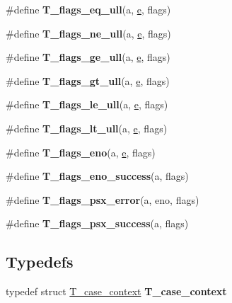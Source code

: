 \begin{DoxyCompactItemize}
\item 
\#define {\bfseries T\+\_\+flags\+\_\+eq\+\_\+ull}(a,  \mbox{\hyperlink{sun4u_2tte_8h_a8b0b9ed08e0e18920ec2682f48228c27}{e}},  flags)
\item 
\#define {\bfseries T\+\_\+flags\+\_\+ne\+\_\+ull}(a,  \mbox{\hyperlink{sun4u_2tte_8h_a8b0b9ed08e0e18920ec2682f48228c27}{e}},  flags)
\item 
\#define {\bfseries T\+\_\+flags\+\_\+ge\+\_\+ull}(a,  \mbox{\hyperlink{sun4u_2tte_8h_a8b0b9ed08e0e18920ec2682f48228c27}{e}},  flags)
\item 
\#define {\bfseries T\+\_\+flags\+\_\+gt\+\_\+ull}(a,  \mbox{\hyperlink{sun4u_2tte_8h_a8b0b9ed08e0e18920ec2682f48228c27}{e}},  flags)
\item 
\#define {\bfseries T\+\_\+flags\+\_\+le\+\_\+ull}(a,  \mbox{\hyperlink{sun4u_2tte_8h_a8b0b9ed08e0e18920ec2682f48228c27}{e}},  flags)
\item 
\#define {\bfseries T\+\_\+flags\+\_\+lt\+\_\+ull}(a,  \mbox{\hyperlink{sun4u_2tte_8h_a8b0b9ed08e0e18920ec2682f48228c27}{e}},  flags)
\item 
\#define {\bfseries T\+\_\+flags\+\_\+eno}(a,  \mbox{\hyperlink{sun4u_2tte_8h_a8b0b9ed08e0e18920ec2682f48228c27}{e}},  flags)
\item 
\#define {\bfseries T\+\_\+flags\+\_\+eno\+\_\+success}(a,  flags)
\item 
\#define {\bfseries T\+\_\+flags\+\_\+psx\+\_\+error}(a,  eno,  flags)
\item 
\#define {\bfseries T\+\_\+flags\+\_\+psx\+\_\+success}(a,  flags)
\end{DoxyCompactItemize}
\subsection*{Typedefs}
\begin{DoxyCompactItemize}
\item 
\mbox{\label{group__RTEMSTestFrameworkImpl_ga3e23508b3d587e17d236a371a37f261b}} 
typedef struct \mbox{\hyperlink{structT__case__context}{T\+\_\+case\+\_\+context}} {\bfseries T\+\_\+case\+\_\+context}
\end{DoxyCompactItemize}
